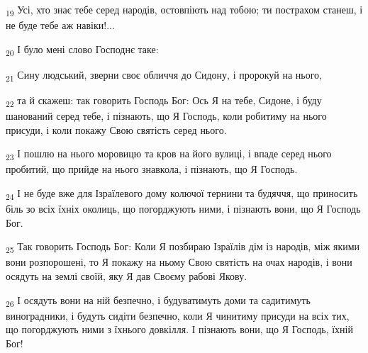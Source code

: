 \begin{tcolorbox}
\textsubscript{19} Усі, хто знає тебе серед народів, остовпіють над тобою; ти пострахом станеш, і не буде тебе аж навіки!...
\end{tcolorbox}
\begin{tcolorbox}
\textsubscript{20} І було мені слово Господнє таке:
\end{tcolorbox}
\begin{tcolorbox}
\textsubscript{21} Сину людський, зверни своє обличчя до Сидону, і пророкуй на нього,
\end{tcolorbox}
\begin{tcolorbox}
\textsubscript{22} та й скажеш: так говорить Господь Бог: Ось Я на тебе, Сидоне, і буду шанований серед тебе, і пізнають, що Я Господь, коли робитиму на нього присуди, і коли покажу Свою святість серед нього.
\end{tcolorbox}
\begin{tcolorbox}
\textsubscript{23} І пошлю на нього моровицю та кров на його вулиці, і впаде серед нього пробитий, що прийде на нього знавкола, і пізнають, що Я Господь.
\end{tcolorbox}
\begin{tcolorbox}
\textsubscript{24} І не буде вже для Ізраїлевого дому колючої тернини та будяччя, що приносить біль зо всіх їхніх околиць, що погорджують ними, і пізнають вони, що Я Господь Бог.
\end{tcolorbox}
\begin{tcolorbox}
\textsubscript{25} Так говорить Господь Бог: Коли Я позбираю Ізраїлів дім із народів, між якими вони розпорошені, то Я покажу на ньому Свою святість на очах народів, і вони осядуть на землі своїй, яку Я дав Своєму рабові Якову.
\end{tcolorbox}
\begin{tcolorbox}
\textsubscript{26} І осядуть вони на ній безпечно, і будуватимуть доми та садитимуть виноградники, і будуть сидіти безпечно, коли Я чинитиму присуди на всіх тих, що погорджують ними з їхнього довкілля. І пізнають вони, що Я Господь, їхній Бог!
\end{tcolorbox}
